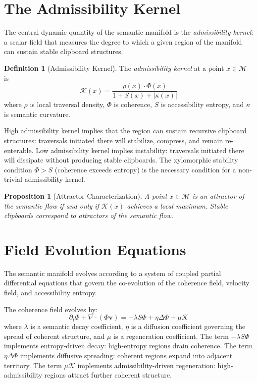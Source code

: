 \documentclass[12pt,oneside]{book}
\theoremstyle{plain}
\newtheorem{proposition}[theorem]{Proposition}
\theoremstyle{definition}
\newtheorem{definition}[theorem]{Definition}
\theoremstyle{plain}
\newcommand{\cM}{\mathcal{M}}
\begin{document}
\section{The Admissibility Kernel}

The central dynamic quantity of the semantic manifold is the \emph{admissibility kernel}: a scalar field that measures the degree to which a given region of the manifold can sustain stable clipboard structures.

\begin{definition}[Admissibility Kernel]
The \emph{admissibility kernel} at a point $x \in \cM$ is
\[
\mathcal{K}(x) = \frac{\rho(x) \cdot \Phi(x)}{1 + S(x) + |\kappa(x)|}
\]
where $\rho$ is local traversal density, $\Phi$ is coherence, $S$ is accessibility entropy, and $\kappa$ is semantic curvature.
\end{definition}

High admissibility kernel implies that the region can sustain recursive clipboard structures: traversals initiated there will stabilize, compress, and remain re-enterable. Low admissibility kernel implies instability: traversals initiated there will dissipate without producing stable clipboards. The xylomorphic stability condition $\Phi > S$ (coherence exceeds entropy) is the necessary condition for a non-trivial admissibility kernel.

\begin{proposition}[Attractor Characterization]
A point $x \in \cM$ is an \emph{attractor} of the semantic flow if and only if $\mathcal{K}(x)$ achieves a local maximum. Stable clipboards correspond to attractors of the semantic flow.
\end{proposition}

\section{Field Evolution Equations}

The semantic manifold evolves according to a system of coupled partial differential equations that govern the co-evolution of the coherence field, velocity field, and accessibility entropy.

The coherence field evolves by:
\[
\partial_t \Phi + \nabla \cdot (\Phi \mathbf{v}) = -\lambda S \Phi + \eta \Delta \Phi + \mu \mathcal{K}
\]
where $\lambda$ is a semantic decay coefficient, $\eta$ is a diffusion coefficient governing the spread of coherent structure, and $\mu$ is a regeneration coefficient. The term $-\lambda S \Phi$ implements entropy-driven decay: high-entropy regions drain coherence. The term $\eta \Delta \Phi$ implements diffusive spreading: coherent regions expand into adjacent territory. The term $\mu \mathcal{K}$ implements admissibility-driven regeneration: high-admissibility regions attract further coherent structure.
\end{document}
